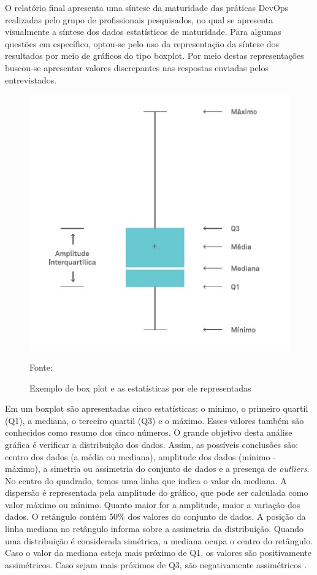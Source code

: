 \documentclass[twoside,english,brazilian]{UNISINOSartigo}
\newcommand{\source}[1]{\caption*{Fonte: {#1}} }
\begin{document}
O relatório final apresenta uma síntese da maturidade das práticas DevOps realizadas pelo grupo de profissionais pesquisados, no qual se apresenta visualmente a síntese dos dados estatísticos de maturidade. Para algumas questões em específico, optou-se pelo uso da representação da síntese dos resultados por meio de gráficos do tipo boxplot. Por meio destas representações buscou-se apresentar valores discrepantes nas respostas enviadas pelos entrevistados.

\begin{figure}[H]
    \centering
    \caption{Exemplo de box plot e as estatísticas por ele representadas}
       \includegraphics[scale=.6]{imagens/resumo-cinco-numeros-box-plot.jpg}
        \source{}
\end{figure}

Em um boxplot são apresentadas cinco estatísticas: o mínimo, o primeiro quartil (Q1), a mediana, o terceiro quartil (Q3) e o máximo. Esses valores também são conhecidos como resumo dos cinco números.
O grande objetivo desta análise gráfica é verificar a distribuição dos dados. Assim, as possíveis conclusões são: centro dos dados (a média ou mediana), amplitude dos dados (mínimo - máximo), a simetria ou assimetria do conjunto de dados e a presença de \textit{outliers}.
No centro do quadrado, temos uma linha que indica o valor da mediana. A dispersão é representada pela amplitude do gráfico, que pode ser calculada como valor máximo ou mínimo. Quanto maior for a amplitude, maior a variação dos dados.
O retângulo contém 50\% dos valores do conjunto de dados. A posição da linha mediana no retângulo informa sobre a assimetria da distribuição. Quando uma distribuição é considerada simétrica, a mediana ocupa o centro do retângulo. Caso o valor da mediana esteja mais próximo de Q1, os valores são positivamente assimétricos. Caso sejam mais próximos de Q3, são negativamente assimétricos \cite{EDTIBoxPlot}.
\end{document}
